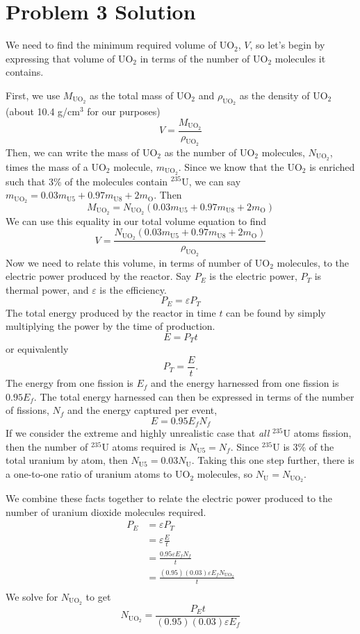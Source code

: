 \section*{Problem 3 Solution}

We need to find the minimum required volume of UO$_2$, $V$, so let's begin by expressing that volume of UO$_2$ in terms of the number of UO$_2$ molecules it contains. 

First, we use $M_{\text{UO}_2}$ as the total mass of UO$_2$ and $\rho_{\text{UO}_2}$ as the density of UO$_2$ (about 10.4 g/cm$^3$ for our purposes)
$$ V = \frac{M_{\text{UO}_2}}{\rho_{\text{UO}_2}} $$
Then, we can write the mass of UO$_2$ as the number of UO$_2$ molecules, $N_{\text{UO}_2}$, times the mass of a UO$_2$ molecule, $m_{\text{UO}_2}$. Since we know that the UO$_2$ is enriched such that 3\% of the molecules contain $^{235}$U, we can say $m_{\text{UO}_2} = 0.03m_{\text{U5}} + 0.97m_{\text{U8}} + 2m_{\text{O}}$. Then
$$ M_{\text{UO}_2} = N_{\text{UO}_2}(0.03m_{\text{U5}} + 0.97m_{\text{U8}} + 2m_{\text{O}}) $$
We can use this equality in our total volume equation to find
\begin{equation}
\label{vol}
V = \frac{N_{\text{UO}_2}(0.03m_{\text{U5}} + 0.97m_{\text{U8}} + 2 m_{\text{O}})}{\rho_{\text{UO}_2}}
\end{equation}
Now we need to relate this volume, in terms of number of UO$_2$ molecules, to the electric power produced by the reactor. Say $P_E$ is the electric power, $P_T$ is thermal power, and $\varepsilon$ is the efficiency. 
$$ P_E = \varepsilon P_T $$
The total energy produced by the reactor in time $t$ can be found by simply multiplying the power by the time of production.
$$ E = P_T t $$
or equivalently
$$ P_T = \frac{E}{t} .$$
The energy from one fission is $E_f$ and the energy harnessed from one fission is $0.95E_f$. The total energy harnessed can then be expressed in terms of the number of fissions, $N_f$ and the energy captured per event,
$$ E = 0.95E_f N_f $$
If we consider the extreme and highly unrealistic case that \textit{all} $^{235}$U atoms fission, then the number of $^{235}$U atoms required is $N_{\text{U5}} = N_f$. Since $^{235}$U is 3\% of the total uranium by atom, then $N_{\text{U5}} = 0.03N_{\text{U}}$. Taking this one step further, there is a one-to-one ratio of uranium atoms to UO$_2$ molecules, so $N_{\text{U}} = N_{\text{UO}_2}$.

We combine these facts together to relate the electric power produced to the number of uranium dioxide molecules required.
\begin{align*} 
P_E	&= \varepsilon P_T \\
	&= \varepsilon \frac{E}{t} \\
	&= \frac{0.95\varepsilon E_f N_f}{t} \\
	&= \frac{(0.95)(0.03)\varepsilon E_f N_{\text{UO}_2}}{t} \\
\end{align*}
We solve for $N_{\text{UO}_2}$ to get
\begin{equation}
\label{num}
N_{\text{UO}_2} = \frac{P_E t}{(0.95)(0.03)\varepsilon E_f}
\end{equation}

